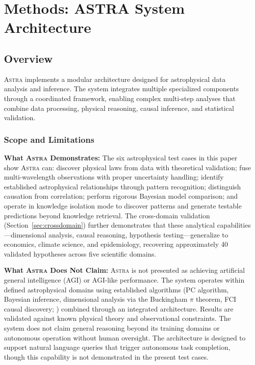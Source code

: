 \documentclass[fleqn,usenatbib]{mnras}
\newcommand{\astra}{\textsc{Astra}\xspace}
\newcommand{\pc}{PC\xspace}
\newcommand{\fci}{FCI\xspace}
\begin{document}
\section{Methods: ASTRA System Architecture}
\label{sec:methods}

\subsection{Overview}
\label{sec:methods:overview}

\astra implements a modular architecture designed for astrophysical data analysis and inference.
The system integrates multiple specialized components through a coordinated framework, enabling complex multi-step analyses that combine data processing, physical reasoning, causal inference, and statistical validation.

\subsubsection{Scope and Limitations}
\label{sec:scope}

\textbf{What \astra Demonstrates:}
The six astrophysical test cases in this paper show \astra can: discover physical laws from data with theoretical validation; fuse multi-wavelength observations with proper uncertainty handling; identify established astrophysical relationships through pattern recognition; distinguish causation from correlation; perform rigorous Bayesian model comparison; and operate in knowledge isolation mode to discover patterns and generate testable predictions beyond knowledge retrieval.
The cross-domain validation (Section~\ref{sec:crossdomain}) further demonstrates that these analytical capabilities---dimensional analysis, causal reasoning, hypothesis testing---generalize to economics, climate science, and epidemiology, recovering approximately 40 validated hypotheses across five scientific domains.

\textbf{What \astra Does Not Claim:}
\astra is not presented as achieving artificial general intelligence (AGI) or AGI-like performance.
The system operates within defined astrophysical domains using established algorithms (\pc algorithm, Bayesian inference, dimensional analysis via the Buckingham $\pi$ theorem, \fci causal discovery; \citealt{Zhang2008}) combined through an integrated architecture.
Results are validated against known physical theory and observational constraints.
The system does not claim general reasoning beyond its training domains or autonomous operation without human oversight.
The architecture is designed to support natural language queries that trigger autonomous task completion, though this capability is not demonstrated in the present test cases.
\end{document}

